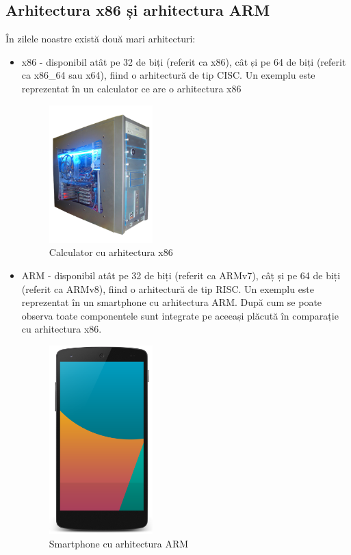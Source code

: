 \subsection{Arhitectura x86 și arhitectura ARM}
\label{sec:hardware-class-arm-x86}

În zilele noastre există două mari arhitecturi:

\begin{itemize}
	\item x86 - disponibil atât pe 32 de biți (referit ca x86), cât și pe 64
		de biți (referit ca x86_64 sau x64), fiind o arhitectură de tip
		CISC. Un exemplu este reprezentat în
		 un calculator ce are o
		arhitectura x86

\begin{figure}[!htbp]
	\centering
	\includegraphics[width=4cm]{chapters/08-hw/img/pc-img.png}
	\caption{Calculator cu arhitectura x86\protect\footnotemark}
	\label{fig:hw-x86}
\end{figure}


	\item ARM - disponibil atât pe 32 de biți (referit ca ARMv7), câț și pe
		64 de biți (referit ca ARMv8), fiind o arhitectură de tip RISC.
		Un exemplu este reprezentat în
		 un smartphone cu arhitectura
		ARM. După cum se poate observa toate componentele sunt integrate
		pe aceeași plăcută în comparație cu arhitectura x86.

\begin{figure}[!htbp]
	\centering
	\includegraphics[width=4cm]{chapters/08-hw/img/arm-img.png}
	\caption{Smartphone cu arhitectura ARM\protect\footnotemark}
	\label{fig:hw-arm}
\end{figure}


\end{itemize}
